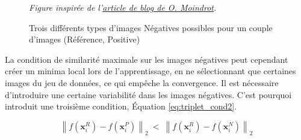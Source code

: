 \begin{figure}[hbtp]
	\centering
	
	\caption{Trois différents types d'images Négatives possibles pour un couple d'images (Référence, Positive)}
	\textit{Figure inspirée de l'\href{https://omoindrot.github.io/triplet-loss}{article de blog de O. Moindrot}.}
	\label{fig:triplet_neg}
\end{figure}

La condition de similarité maximale sur les images négatives peut cependant créer un minima local lors de l'apprentissage, en ne sélectionnant que certaines images du jeu de données, ce qui empêche  la convergence.
Il est nécessaire d'introduire une certaine variabilité dans les images négatives.
C'est pourquoi \cite{schroff_facenet_2015} introduit une troisième condition, Équation \ref{eq:triplet_cond2}.

\begin{equation} \label{eq:triplet_cond2}
\left\|f\left(\mathbf{x}_{i}^{R}\right)-f\left(\mathbf{x}_{i}^{P}\right)\right\|_{2} \ < \ \left\|f\left(\mathbf{x}_{i}^{R}\right)-f\left(\mathbf{x}_{i}^{N}\right)\right\|_{2}
\end{equation}

